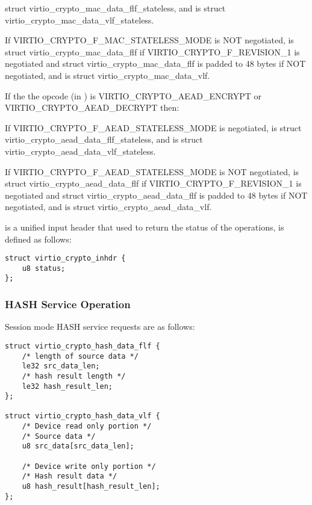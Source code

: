 \begin{itemize*}
\begin{itemize*}
        struct virtio_crypto_mac_data_flf_stateless, and  is struct
        virtio_crypto_mac_data_vlf_stateless.
    \item If VIRTIO_CRYPTO_F_MAC_STATELESS_MODE is NOT negotiated, 
        is struct virtio_crypto_mac_data_flf if VIRTIO_CRYPTO_F_REVISION_1 is negotiated
        and struct virtio_crypto_mac_data_flf is padded to 48 bytes if NOT negotiated,
        and  is struct virtio_crypto_mac_data_vlf.
    \end{itemize*}
\item If the the opcode (in ) is VIRTIO_CRYPTO_AEAD_ENCRYPT
    or VIRTIO_CRYPTO_AEAD_DECRYPT then:
    \begin{itemize*}
    \item If VIRTIO_CRYPTO_F_AEAD_STATELESS_MODE is negotiated,  is
        struct virtio_crypto_aead_data_flf_stateless, and  is struct
        virtio_crypto_aead_data_vlf_stateless.
    \item If VIRTIO_CRYPTO_F_AEAD_STATELESS_MODE is NOT negotiated, 
        is struct virtio_crypto_aead_data_flf if VIRTIO_CRYPTO_F_REVISION_1 is negotiated
        and struct virtio_crypto_aead_data_flf is padded to 48 bytes if NOT negotiated,
        and  is struct virtio_crypto_aead_data_vlf.
    \end{itemize*}
\end{itemize*}

 is a unified input header that used to return the status of
the operations, is defined as follows:

\begin{lstlisting}
struct virtio_crypto_inhdr {
    u8 status;
};
\end{lstlisting}

\subsubsection{HASH Service Operation}\label{sec:Device Types / Crypto Device / Device Operation / HASH Service Operation}

Session mode HASH service requests are as follows:

\begin{lstlisting}
struct virtio_crypto_hash_data_flf {
    /* length of source data */
    le32 src_data_len;
    /* hash result length */
    le32 hash_result_len;
};

struct virtio_crypto_hash_data_vlf {
    /* Device read only portion */
    /* Source data */
    u8 src_data[src_data_len];

    /* Device write only portion */
    /* Hash result data */
    u8 hash_result[hash_result_len];
};
\end{lstlisting}

